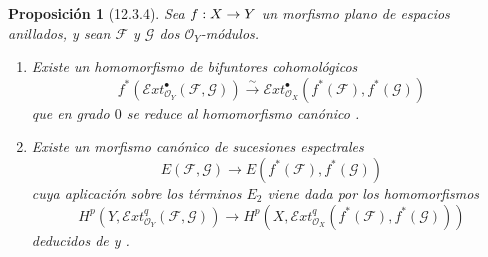 \documentclass[10pt,oneside,openany]{book}
\theoremstyle{egaenv}\newtheorem*{env}{---}
\theoremstyle{egastatement}
\newtheorem*{proposition}{Proposición}
\theoremstyle{egadescription}
\newcommand{\oldpage}[2][]{\marginnote{\normalfont\scriptsize\textbf{#1}\,|\,#2}\ignorespaces}
\renewcommand{\to}{\mathchoice{\longrightarrow}{\rightarrow}{\rightarrow}{\rightarrow}}
\begin{document}
\oldpage[0\textsubscript{III}]{61}
\begin{proposition}[12.3.4]
\label{0.12.3.4}
\label{0.12.3.4-fr}
Sea $f:X\to Y$ un morfismo \textup{plano} de espacios anillados, y sean
$\mathcal F$ y $\mathcal G$ dos $\mathcal O_Y$-módulos.
\begin{enumerate}
  \item[\rm(i)] Existe un homomorfismo de bifuntores cohomológicos
  \[
\label{0.12.3.4.1-fr}
\tag{12.3.4.1}
f^*(\mathcal{E}xt_{\mathcal O_Y}^{\bullet}(\mathcal F,\mathcal G))
\xrightarrow{\sim}
\mathcal{E}xt_{\mathcal O_X}^{\bullet}(f^*(\mathcal F),f^*(\mathcal G))
\]
  que en grado $0$ se reduce al homomorfismo canónico
  .

  \item[\rm(ii)] Existe un morfismo canónico de sucesiones espectrales
  \[
\label{0.12.3.4.2-fr}
\tag{12.3.4.2}
E(\mathcal F,\mathcal G)\longrightarrow
E(f^*(\mathcal F),f^*(\mathcal G))
\]
  cuya aplicación sobre los términos $E_2$ viene dada por los homomorfismos
  \[
\label{0.12.3.4.3-fr}
\tag{12.3.4.3}
H^p(Y,\mathcal{E}xt_{\mathcal O_Y}^q(\mathcal F,\mathcal G))
\longrightarrow
H^p(X,\mathcal{E}xt_{\mathcal O_X}^q(f^*(\mathcal F),f^*(\mathcal G)))
\]
  deducidos de  y .
\end{enumerate}
\end{proposition}
\end{document}
